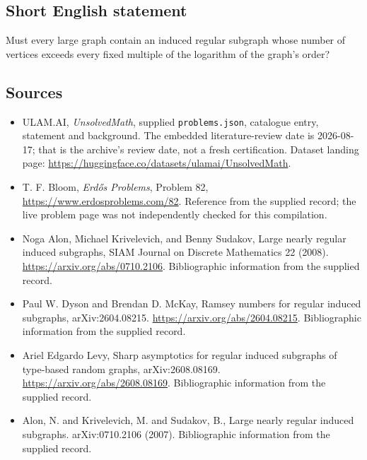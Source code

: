 \documentclass[11pt,a4paper]{article}
\begin{document}
\subsection{Short English statement}

Must every large graph contain an induced regular subgraph whose number of vertices exceeds every fixed multiple of the logarithm of the graph's order?

\subsection{Sources}

{\small

\begin{itemize}

\item[\hypertarget{source:statement:1}{S1}] ULAM.AI, \emph{UnsolvedMath}, supplied \texttt{problems.json}, catalogue entry, statement and background. The embedded literature-review date is 2026-08-17; that is the archive’s review date, not a fresh certification. Dataset landing page: \url{https://huggingface.co/datasets/ulamai/UnsolvedMath}.

\item[\hypertarget{source:statement:2}{S2}] T. F. Bloom, \emph{Erdős Problems}, Problem 82, \url{https://www.erdosproblems.com/82}. Reference from the supplied record; the live problem page was not independently checked for this compilation.

\item[\hypertarget{source:statement:3}{S3}] Noga Alon, Michael Krivelevich, and Benny Sudakov, Large nearly regular induced subgraphs, SIAM Journal on Discrete Mathematics 22 (2008). \url{https://arxiv.org/abs/0710.2106}. Bibliographic information from the supplied record.

\item[\hypertarget{source:statement:4}{S4}] Paul W. Dyson and Brendan D. McKay, Ramsey numbers for regular induced subgraphs, arXiv:2604.08215. \url{https://arxiv.org/abs/2604.08215}. Bibliographic information from the supplied record.

\item[\hypertarget{source:statement:5}{S5}] Ariel Edgardo Levy, Sharp asymptotics for regular induced subgraphs of type-based random graphs, arXiv:2608.08169. \url{https://arxiv.org/abs/2608.08169}. Bibliographic information from the supplied record.

\item[\hypertarget{source:statement:6}{S6}] Alon, N. and Krivelevich, M. and Sudakov, B., Large nearly regular induced subgraphs. arXiv:0710.2106 (2007). Bibliographic information from the supplied record.

\end{itemize}

}

\label{end:statement}
\end{document}
